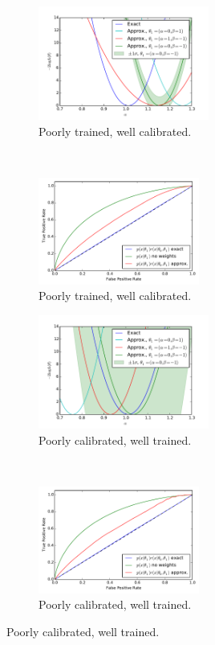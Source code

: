 \documentclass[12pt]{article}
\numberwithin{equation}{section}
\theoremstyle{plain}
\begin{document}
\begin{figure}
    \centering
    \begin{subfigure}[t]{0.4\textwidth}
        \centering
        \includegraphics[clip, trim=0.3cm 0.3cm 0.3cm 0.3cm,height=10.075em]{figures/likelihood_comp_0.pdf}
        \caption{Poorly trained, well calibrated. }
        \label{fig:6a}
    \end{subfigure}
    ~
    \begin{subfigure}[t]{0.4\textwidth}
        \centering
        \includegraphics[clip, trim=0.3cm 0.3cm 0.3cm 0.3cm,height=9.5em]{figures/ROC_comp0.pdf}
        \caption{Poorly trained, well calibrated. }
        \label{fig:6b}
    \end{subfigure}

    \begin{subfigure}[t]{0.4\textwidth}
        \centering
        \includegraphics[clip, trim=0.3cm 0.3cm 0.3cm 0.3cm,height=10.075em]{figures/likelihood_comp_1.pdf}
        \caption{Poorly calibrated, well trained. }
        \label{fig:6c}
    \end{subfigure}
    ~
    \begin{subfigure}[t]{0.4\textwidth}
        \centering
        \includegraphics[clip, trim=0.3cm 0.3cm 0.3cm 0.3cm,height=9.5em]{figures/ROC_comp1.pdf}
        \caption{Poorly calibrated, well trained. }
        \label{fig:6d}
    \end{subfigure}


\end{figure}
\end{document}
